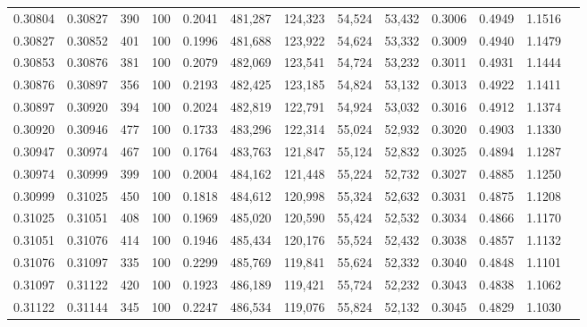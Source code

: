 \begin{tabular}{rrrrrrrrrrrrr}
0.30804 & 0.30827 &   390 & 100 &                                     0.2041 & 481,287 & 124,323 &  54,524 &  53,432 & 0.3006 & 0.4949 & 1.1516 \\
0.30827 & 0.30852 &   401 & 100 &                                     0.1996 & 481,688 & 123,922 &  54,624 &  53,332 & 0.3009 & 0.4940 & 1.1479 \\
0.30853 & 0.30876 &   381 & 100 &                                     0.2079 & 482,069 & 123,541 &  54,724 &  53,232 & 0.3011 & 0.4931 & 1.1444 \\
0.30876 & 0.30897 &   356 & 100 &                                     0.2193 & 482,425 & 123,185 &  54,824 &  53,132 & 0.3013 & 0.4922 & 1.1411 \\
0.30897 & 0.30920 &   394 & 100 &                                     0.2024 & 482,819 & 122,791 &  54,924 &  53,032 & 0.3016 & 0.4912 & 1.1374 \\
0.30920 & 0.30946 &   477 & 100 &                                     0.1733 & 483,296 & 122,314 &  55,024 &  52,932 & 0.3020 & 0.4903 & 1.1330 \\
0.30947 & 0.30974 &   467 & 100 &                                     0.1764 & 483,763 & 121,847 &  55,124 &  52,832 & 0.3025 & 0.4894 & 1.1287 \\
0.30974 & 0.30999 &   399 & 100 &                                     0.2004 & 484,162 & 121,448 &  55,224 &  52,732 & 0.3027 & 0.4885 & 1.1250 \\
0.30999 & 0.31025 &   450 & 100 &                                     0.1818 & 484,612 & 120,998 &  55,324 &  52,632 & 0.3031 & 0.4875 & 1.1208 \\
0.31025 & 0.31051 &   408 & 100 &                                     0.1969 & 485,020 & 120,590 &  55,424 &  52,532 & 0.3034 & 0.4866 & 1.1170 \\
0.31051 & 0.31076 &   414 & 100 &                                     0.1946 & 485,434 & 120,176 &  55,524 &  52,432 & 0.3038 & 0.4857 & 1.1132 \\
0.31076 & 0.31097 &   335 & 100 &                                     0.2299 & 485,769 & 119,841 &  55,624 &  52,332 & 0.3040 & 0.4848 & 1.1101 \\
0.31097 & 0.31122 &   420 & 100 &                                     0.1923 & 486,189 & 119,421 &  55,724 &  52,232 & 0.3043 & 0.4838 & 1.1062 \\
0.31122 & 0.31144 &   345 & 100 &                                     0.2247 & 486,534 & 119,076 &  55,824 &  52,132 & 0.3045 & 0.4829 & 1.1030 \\

\end{tabular}
